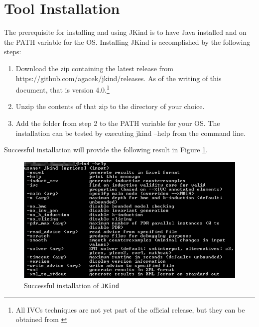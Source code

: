 \section{Tool Installation}
The prerequisite for installing and using JKind is to have Java installed and on the PATH variable for the OS.
Installing JKind is accomplished by the following steps:
\begin{enumerate}
  \item Download the zip containing the latest release from https://github.com/agacek/jkind/releases. As of the writing of this document, that is version 4.0.\footnote{All IVCs techniques are not yet part of the official release, but they can be obtained from \cite{mygit}}
  \item Unzip the contents of that zip to the directory of your choice.
  \item Add the folder from step 2 to the PATH variable for your OS.
The installation can be tested by executing jkind –help from the command line.
\end{enumerate}
Successful installation will provide the following result in Figure \ref{fig:jkins}.

 \begin{figure}
 \centering
  \includegraphics[width=\columnwidth]{figs/jkindcon.png}
  \caption{Successful installation of \texttt{JKind}}
  \vspace{0.1in}
  \label{fig:jkins}
\end{figure}

